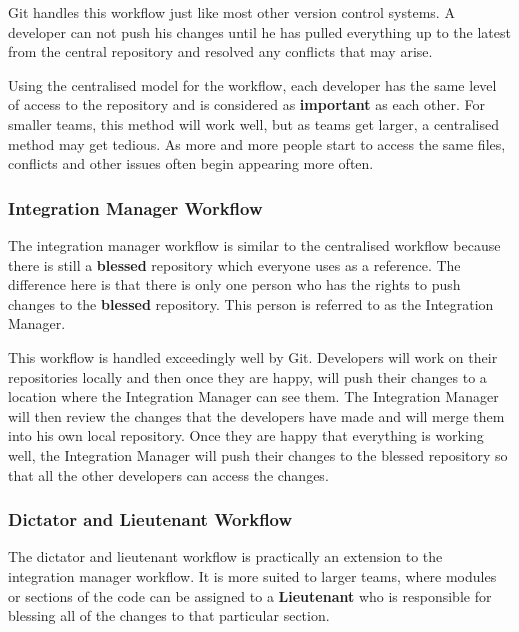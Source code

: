 Git handles this workflow just like most other version control systems.
A developer can not push his changes until he has pulled everything up to the latest from the central repository and resolved any conflicts that may arise.

Using the centralised model for the workflow, each developer has the same level of access to the repository and is considered as \textbf{important} as each other.
For smaller teams, this method will work well, but as teams get larger, a centralised method may get tedious.
As more and more people start to access the same files, conflicts and other issues often begin appearing more often.


\subsubsection{Integration Manager Workflow}
The integration manager workflow is similar to the centralised workflow because there is still a \textbf{blessed} repository which everyone uses as a reference.
The difference here is that there is only one person who has the rights to push changes to the \textbf{blessed} repository.
This person is referred to as the Integration Manager.

This workflow is handled exceedingly well by Git.
Developers will work on their repositories locally and then once they are happy, will push their changes to a location where the Integration Manager can see them.
The Integration Manager will then review the changes that the developers have made and will merge them into his own local repository.
Once they are happy that everything is working well, the Integration Manager will push their changes to the blessed repository so that all the other developers can access the changes.


\subsubsection{Dictator and Lieutenant Workflow}
The dictator and lieutenant workflow is practically an extension to the integration manager workflow.
It is more suited to larger teams, where modules or sections of the code can be assigned to a \textbf{Lieutenant} who is responsible for blessing all of the changes to that particular section.

